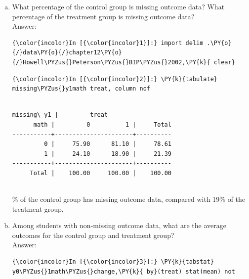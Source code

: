 \documentclass[11pt,notitlepage]{article}\usepackage[]{graphicx}\usepackage[]{color}
\makeatletter
\newenvironment{kframe}{%
 \def\at@end@of@kframe{}%
 \ifinner\ifhmode%
  \def\at@end@of@kframe{\end{minipage}}%
  \begin{minipage}{\columnwidth}%
 \fi\fi%
 \def\FrameCommand##1{\hskip\@totalleftmargin \hskip-\fboxsep
 \colorbox{shadecolor}{##1}\hskip-\fboxsep
     \hskip-\linewidth \hskip-\@totalleftmargin \hskip\columnwidth}%
 \MakeFramed {\advance\hsize-\width
   \@totalleftmargin\z@ \linewidth\hsize
   \@setminipage}}%
 {\par\unskip\endMakeFramed%
 \at@end@of@kframe}
\newenvironment{knitrout}{}{} %
\makeatother
\begin{document}
\begin{enumerate}[a)]
\item What percentage of the control group is missing outcome data? What percentage of the treatment group is missing outcome data?\\
Answer:\\
\begin{knitrout}
\color{fgcolor}\begin{kframe}
    \begin{Verbatim}[commandchars=\\\{\}]
{\color{incolor}In [{\color{incolor}1}]:} import delim .\PY{o}{/}data\PY{o}{/}chapter12\PY{o}{/}Howell\PYZus{}Peterson\PYZus{}BIP\PYZus{}2002,\PY{k}{ clear}
\end{Verbatim}

    \begin{Verbatim}[commandchars=\\\{\}]
{\color{incolor}In [{\color{incolor}2}]:} \PY{k}{tabulate} missing\PYZus{}y1math treat, column nof
\end{Verbatim}

    \begin{Verbatim}[commandchars=\\\{\}]

missing\_y1 |         treat
      math |         0          1 |     Total
-----------+----------------------+----------
         0 |     75.90      81.10 |     78.61 
         1 |     24.10      18.90 |     21.39 
-----------+----------------------+----------
     Total |    100.00     100.00 |    100.00 


    \end{Verbatim}
\end{kframe}
\end{knitrout}
24\% of the control group has missing outcome data, compared with 19\% of the treatment group.

\item Among students with non-missing outcome data, what are the average outcomes for the control group and treatment group?\\
Answer:\\
\begin{knitrout}
\color{fgcolor}\begin{kframe}
    \begin{Verbatim}[commandchars=\\\{\}]
{\color{incolor}In [{\color{incolor}3}]:} \PY{k}{tabstat} y0\PYZus{}1math\PYZus{}change,\PY{k}{ by}(treat) stat(mean) not
\end{Verbatim}


\end{kframe}
\end{knitrout}
\end{enumerate}
\end{document}
